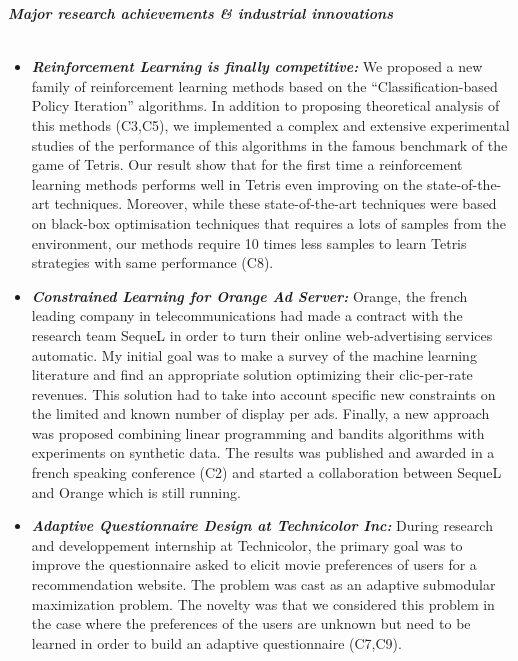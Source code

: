 \noindent\textit{\textbf{Major research achievements \& industrial innovations}}\\[-.4cm]\noindent\makebox[\linewidth]{\rule{\columnwidth}{0.4pt}}\\[.1cm]
\begin{itemize}
\item \textit{} \textit{\textbf{Reinforcement Learning is finally competitive:}} We proposed a new family of reinforcement learning methods based on the ``Classification-based Policy Iteration'' algorithms. In addition to proposing theoretical analysis of this methods (C3,C5), we implemented a complex and extensive experimental studies of the performance of this algorithms in the famous benchmark of the game of Tetris. Our result show that for the first time a reinforcement learning methods performs well in Tetris even improving on the state-of-the-art techniques. Moreover, while these state-of-the-art techniques were based on black-box optimisation techniques that requires a lots of samples from the environment, our methods require 10 times less samples to learn Tetris strategies with same performance (C8).
\item \textit{} \textit{\textbf{Constrained Learning for Orange Ad Server:}} Orange, the french leading company in telecommunications had made a contract with the research team SequeL in order to turn their online web-advertising services automatic. My initial goal was to make a survey of the machine learning literature and find an appropriate solution optimizing their clic-per-rate revenues. This solution had to take into account specific new constraints on the limited and known number of display per ads. Finally, a new approach was proposed combining linear programming and bandits algorithms with experiments on synthetic data. The results was published and awarded in a french speaking conference (C2) and started a collaboration between SequeL and Orange which is still running.  
\item \textit{} \textit{\textbf{Adaptive Questionnaire Design at Technicolor Inc:}} During research and developpement internship at Technicolor, the primary goal was to improve the questionnaire asked to elicit movie preferences of users for a recommendation website. The problem was cast as an adaptive submodular maximization problem. The novelty was that we considered this problem in the case where the preferences of the users are unknown  but need to be learned in order to build an adaptive questionnaire (C7,C9).
\end{itemize}



